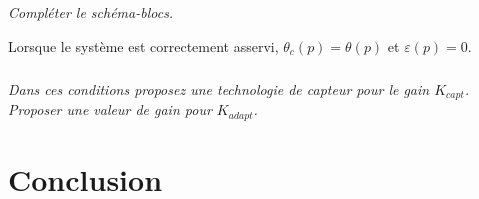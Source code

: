\documentclass[10pt,fleqn]{article} %
\begin{document}
\begin{multicols}{2}
\subparagraph{}\textit{Compléter le schéma-blocs.}

\vspace{.25cm}
Lorsque le système est correctement asservi, $\theta_c(p)=\theta(p)$ et $\varepsilon(p)=0$.

\subparagraph{}\textit{Dans ces conditions proposez une technologie de capteur pour le gain $K_{capt}$. Proposer une valeur de gain pour $K_{adapt}$.}


\section*{Conclusion}

\end{multicols}
\end{document}
